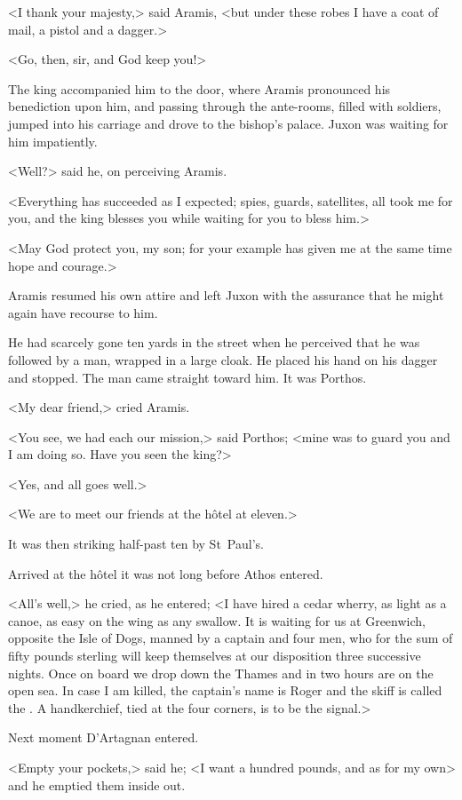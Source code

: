 <I thank your majesty,> said Aramis, <but under these robes I have a coat of mail, a pistol and a dagger.>

<Go, then, sir, and God keep you!>

The king accompanied him to the door, where Aramis pronounced his benediction upon him, and passing through the ante-rooms, filled with soldiers, jumped into his carriage and drove to the bishop's palace. Juxon was waiting for him impatiently.

<Well?> said he, on perceiving Aramis.

<Everything has succeeded as I expected; spies, guards, satellites, all took me for you, and the king blesses you while waiting for you to bless him.>

<May God protect you, my son; for your example has given me at the same time hope and courage.>

Aramis resumed his own attire and left Juxon with the assurance that he might again have recourse to him.

He had scarcely gone ten yards in the street when he perceived that he was followed by a man, wrapped in a large cloak. He placed his hand on his dagger and stopped. The man came straight toward him. It was Porthos.

<My dear friend,> cried Aramis.

<You see, we had each our mission,> said Porthos; <mine was to guard you and I am doing so. Have you seen the king?>

<Yes, and all goes well.>

<We are to meet our friends at the hôtel at eleven.>

It was then striking half-past ten by St~Paul's.

Arrived at the hôtel it was not long before Athos entered.

<All's well,> he cried, as he entered; <I have hired a cedar wherry, as light as a canoe, as easy on the wing as any swallow. It is waiting for us at Greenwich, opposite the Isle of Dogs, manned by a captain and four men, who for the sum of fifty pounds sterling will keep themselves at our disposition three successive nights. Once on board we drop down the Thames and in two hours are on the open sea. In case I am killed, the captain's name is Roger and the skiff is called the . A handkerchief, tied at the four corners, is to be the signal.>

Next moment D'Artagnan entered.

<Empty your pockets,> said he; <I want a hundred pounds, and as for my own\longdash> and he emptied them inside out.

